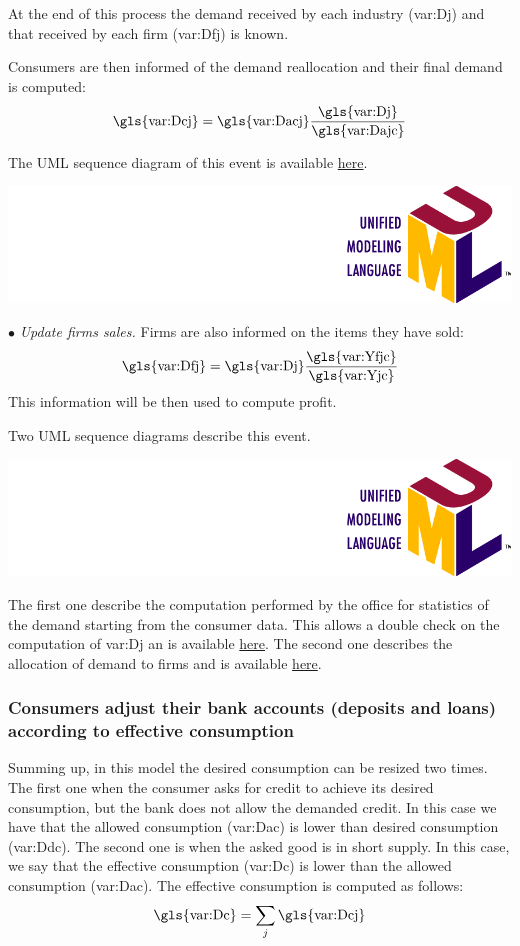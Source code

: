 \documentclass{book}
\newcommand{\doclocation}{file:///Users/giulioni/Documents/workspace/gabriele/docs}
\begin{document}
At the end of this process the demand received by each industry (\gls{var:Dj}) and that received by each firm (\gls{var:Dfj}) is known.

Consumers are then informed of the demand reallocation and their final demand is computed:
\[
	\textnormal{\gls{var:Dcj}}= \textnormal{\gls{var:Dacj}}\frac{\textnormal{\gls{var:Dj}}}{\textnormal{\gls{var:Dajc}}}
\]

The UML sequence diagram of this event is available \href{\doclocation/umldoc/matchDemandAndSupply.html}{here}.
\begin{marginfigure}
	\includegraphics[scale=0.1]{uml.png}
\end{marginfigure}


\noindent$\bullet$ \textit{Update firms sales.}
Firms are also informed on the items they have sold:
\[
	\textnormal{\gls{var:Dfj}}=\textnormal{\gls{var:Dj}}  \frac{\textnormal{\gls{var:Yfjc}}}{\textnormal{\gls{var:Yjc}}}
\]
This information will be then used to compute profit.

Two UML sequence diagrams describe this event. \begin{marginfigure}
	\includegraphics[scale=0.1]{uml.png}
\end{marginfigure}
The first one describe the computation performed by the office for statistics of the demand starting from the consumer data. This allows a double check on the computation of \gls{var:Dj} an is available \href{\doclocation/umldoc/computeDemand.html}{here}. The second one describes the allocation of demand to firms and is available \href{\doclocation/umldoc/allocateDemand.html}{here}.

\subsubsection{Consumers adjust their bank accounts (deposits and loans) according to effective consumption}
Summing up, in this model the desired consumption can be resized two times. The first one when the consumer asks for credit to achieve its desired consumption, but the bank does not allow the demanded credit. In this case we have that the allowed consumption (\gls{var:Dac}) is lower than desired consumption (\gls{var:Ddc}). The second one is when the asked good is in short supply. In this case, we say that the effective consumption (\gls{var:Dc}) is lower than the allowed consumption (\gls{var:Dac}). The effective consumption is computed as follows:
\[
\textnormal{\gls{var:Dc}}=\sum_j \textnormal{\gls{var:Dcj}}
\]
\end{document}
